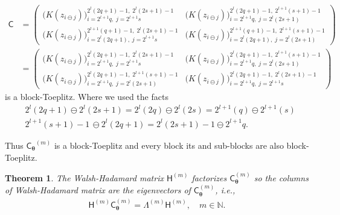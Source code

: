 \documentclass{iitthesis}          %
\newcommand{\bm}[1]{\boldsymbol{#1}}
\newcommand{\naturals}{\mathbb{N}}
\newcommand{\vtheta}{{\bm{\theta}}}
\newcommand{\mC}{\mathsf{C}}
\newcommand{\mH}{\mathsf{H}}
\newcommand{\mCtheta}{{\mathsf{C}_{\vtheta}}}
\newcommand{\ia}{2^{l+1}q}
\newcommand{\ib}{2^{l}(2q+1)-1}
\newcommand{\ic}{2^{l}(2q+1)}
\newcommand{\id}{2^{l+1}(q+1)-1}
\newcommand{\ja}{2^{l+1}s}
\newcommand{\jb}{2^{l}(2s+1)-1}
\newcommand{\jc}{2^{l}(2s+1)}
\newcommand{\jd}{2^{l+1}(s+1)-1}
\newtheorem{theorem}{Theorem}[section]
\begin{document}
\begin{itemize}
\begin{align*}
\mC &=
\begin{pmatrix}
\bigl( K(z_{i \ominus j})\bigr)_{i=\ia, \; j=\ja }^{\ib, \; \jb} & \bigl( K(z_{i \ominus j})\bigr)_{i=\ia, \; j=\jc }^{\ib, \; \jd} \\
\bigl( K(z_{i \ominus j})\bigr)_{i=\ic, \; j=\ja }^{\id, \; \jb} & \bigl( K(z_{i \ominus j})\bigr)_{i=\ic, \; j=\jc }^{\id, \; \jd}
\end{pmatrix} \\
& =
\begin{pmatrix}
\bigl( K(z_{i \ominus j})\bigr)_{i=\ia, \; j=\ja }^{\ib, \; \jb} & \bigl( K(z_{i \ominus j})\bigr)_{i=\ia, \; j=\jc }^{\ib, \; \jd} \\
\bigl( K(z_{i \ominus j})\bigr)_{i=\ia, \; j=\jc }^{\ib, \; \jd} & \bigl( K(z_{i \ominus j})\bigr)_{i=\ia, \; j=\ja }^{\ib, \; \jb}
\end{pmatrix}
\end{align*}
is a block-Toeplitz. Where we used the facts
\begin{align*}
& 2^{l}(2q+1) \ominus 2^{l}(2s+1) = 2^{l}(2q) \ominus 2^{l}(2s) = 2^{l+1}(q) \ominus 2^{l+1}(s) \\
&2^{l+1}(s+1)-1 \, \ominus 2^{l}(2q + 1) %
 = 2^{l}(2s+1)-1 \ominus 2^{l+1}q.
\end{align*}

Thus $\mCtheta^{(m)}$ is a block-Toeplitz and every block its and sub-blocks are also block-Toeplitz.


\end{itemize}
\fi


\begin{theorem}
\label{thrm:hadamard_eigenvector}
The Walsh-Hadamard matrix $\mH^{(m)}$ factorizes $\mC_{\vtheta}^{(m)}$ so the columns of Walsh-Hadamard matrix are the eigenvectors of $\mC_{\vtheta}^{(m)}$, i.e.,
\begin{align*}
\mH^{(m)} \mC_{\vtheta}^{(m)}  = \Lambda^{(m)} \mH^{(m)}, \quad m \in \naturals. 
\end{align*}
\end{theorem}
\end{document}
